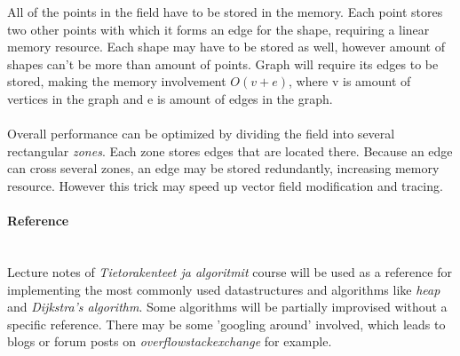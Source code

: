 \documentclass[a4paper,12pt]{article}
\begin{document}
\indent All of the points in the field have to be stored in the memory. Each point stores two other points with which it forms an edge for the shape, requiring a linear memory resource. Each shape may have to be stored as well, however amount of shapes can't be more than amount of points. Graph will require its edges to be stored, making the memory involvement $O(v+e)$, where v is amount of vertices in the graph and e is amount of edges in the graph.
\\
\\
\indent Overall performance can be optimized by dividing the field into several rectangular \emph{zones}. Each zone stores edges that are located there. Because an edge can cross several zones, an edge may be stored redundantly, increasing memory resource. However this trick may speed up vector field modification and tracing.

\paragraph{Reference} \hspace{0pt} \\

Lecture notes of \emph{Tietorakenteet ja algoritmit} course will be used as a reference for implementing the most commonly used datastructures and algorithms like \emph{heap} and \emph{Dijkstra's algorithm}. Some algorithms will be partially improvised without a specific reference. There may be some 'googling around' involved, which leads to blogs or forum posts on \emph{overflowstackexchange} for example.
\end{document}

